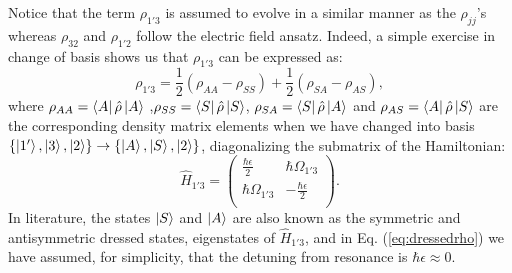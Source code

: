 \documentclass[10pt,letterpaper]{article}
\begin{document}
Notice that the term $\rho_{1'3}$ is assumed to evolve in a similar manner as the $\rho_{jj}$'s whereas $\rho_{32}$ and $\rho_{1'2}$ follow the electric field ansatz. Indeed, a simple exercise in change of basis shows us that $\rho_{1'3}$ can be expressed as:
\begin{equation}
\rho_{1'3} = \frac{1}{2}(\rho_{AA}-\rho_{SS}) + \frac{1}{2}(\rho_{SA}-\rho_{AS}), \label{eq:dressedrho}
\end{equation}
where $\rho_{AA} = \Bra{A}\hat{\rho}\Ket{A}$ ,$\rho_{SS} = \Bra{S}\hat{\rho}\Ket{S}$, $\rho_{SA} = \Bra{S}\hat{\rho}\Ket{A}$ and $\rho_{AS} = \Bra{A}\hat{\rho}\Ket{S}$   are the corresponding density matrix elements when we have changed into basis $\{\Ket{1'},\Ket{3},\Ket{2}\}\to\{\Ket{A},\Ket{S},\Ket{2}\}$, diagonalizing the submatrix of the Hamiltonian:
\begin{equation}
\hat{H}_{1'3} = \begin{pmatrix} 
\frac{\hbar \epsilon}{2} & \hbar\Omega_{1'3}  \\
\hbar\Omega_{1'3}  & -\frac{\hbar	\epsilon}{2} \\
\end{pmatrix} .
\end{equation}
In literature, the states $\Ket{S}$ and $\Ket{A}$ are also known as the symmetric and antisymmetric dressed states, eigenstates of $\hat{H}_{1'3}$, and in Eq. (\ref{eq:dressedrho}) we have assumed, for simplicity, that the detuning from resonance is $\hbar\epsilon \approx 0$.
\end{document}
